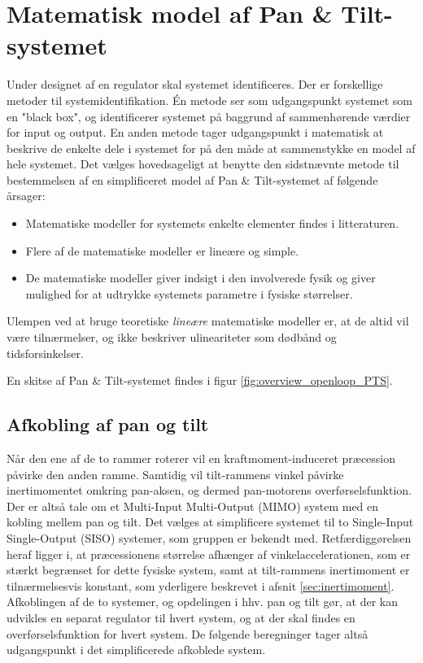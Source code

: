\section{Matematisk model af Pan \& Tilt-systemet}
\label{sec:matPTS}
Under designet af en regulator skal systemet identificeres. Der er forskellige metoder til systemidentifikation.
Én metode ser som udgangspunkt systemet som en "black box", og identificerer systemet
på baggrund af sammenhørende værdier for input og output.
En anden metode tager udgangspunkt i matematisk at beskrive de enkelte dele i systemet
for på den måde at sammenstykke en model af hele systemet.
Det vælges hovedsageligt at benytte den sidstnævnte metode til bestemmelsen af en simplificeret
model af Pan \& Tilt-systemet af følgende årsager:
\begin{itemize}
\item Matematiske modeller for systemets enkelte elementer findes i litteraturen.
\item Flere af de matematiske modeller er lineære og simple.
\item De matematiske modeller giver indsigt i den involverede fysik og giver mulighed
	for at udtrykke systemets parametre i fysiske størrelser.
\end{itemize}
Ulempen ved at bruge teoretiske \textit{lineære} matematiske modeller er,
at de altid vil være tilnærmelser, og ikke beskriver ulineariteter som dødbånd og tidsforsinkelser.

En skitse af Pan \& Tilt-systemet findes i figur \ref{fig:overview_openloop_PTS}.

\subsection{Afkobling af pan og tilt}
Når den ene af de to rammer roterer vil en kraftmoment-induceret præcession påvirke den anden ramme.
Samtidig vil tilt-rammens vinkel påvirke inertimomentet omkring pan-aksen, og dermed
pan-motorens overførselsfunktion.
Der er altså tale om et Multi-Input Multi-Output (MIMO) system med en kobling mellem pan og tilt.
Det vælges at simplificere systemet til to Single-Input Single-Output (SISO) systemer, som gruppen er bekendt med.
Retfærdiggørelsen heraf ligger i, at præcessionens størrelse afhænger af vinkelaccelerationen, som er stærkt begrænset
for dette fysiske system, samt at tilt-rammens inertimoment er tilnærmelsesvis konstant, som yderligere beskrevet i afsnit \ref{sec:inertimoment}.
Afkoblingen af de to systemer, og opdelingen i hhv. pan og tilt gør, at der kan udvikles en separat regulator
til hvert system, og at der skal findes en overførselsfunktion for hvert system.
De følgende beregninger tager altså udgangspunkt i det simplificerede afkoblede system.

